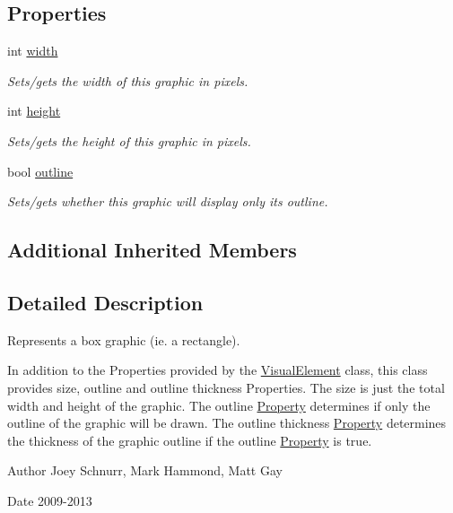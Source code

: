 \subsection*{Properties}
\begin{DoxyCompactItemize}
\item 
\hypertarget{class_picto_1_1_box_graphic_a52194af79e05c8ea7d895250cbc9ce5a}{int \hyperlink{class_picto_1_1_box_graphic_a52194af79e05c8ea7d895250cbc9ce5a}{width}}\label{class_picto_1_1_box_graphic_a52194af79e05c8ea7d895250cbc9ce5a}

\begin{DoxyCompactList}\small\item\em Sets/gets the width of this graphic in pixels. \end{DoxyCompactList}\item 
\hypertarget{class_picto_1_1_box_graphic_aa3040f2594acaa4da7b7b322bdc2c13d}{int \hyperlink{class_picto_1_1_box_graphic_aa3040f2594acaa4da7b7b322bdc2c13d}{height}}\label{class_picto_1_1_box_graphic_aa3040f2594acaa4da7b7b322bdc2c13d}

\begin{DoxyCompactList}\small\item\em Sets/gets the height of this graphic in pixels. \end{DoxyCompactList}\item 
\hypertarget{class_picto_1_1_box_graphic_a7c3cd6c20925e294df01c40c6a798518}{bool \hyperlink{class_picto_1_1_box_graphic_a7c3cd6c20925e294df01c40c6a798518}{outline}}\label{class_picto_1_1_box_graphic_a7c3cd6c20925e294df01c40c6a798518}

\begin{DoxyCompactList}\small\item\em Sets/gets whether this graphic will display only its outline. \end{DoxyCompactList}\end{DoxyCompactItemize}
\subsection*{Additional Inherited Members}


\subsection{Detailed Description}
Represents a box graphic (ie. a rectangle). 

In addition to the Properties provided by the \hyperlink{struct_picto_1_1_visual_element}{Visual\-Element} class, this class provides size, outline and outline thickness Properties. The size is just the total width and height of the graphic. The outline \hyperlink{class_picto_1_1_property}{Property} determines if only the outline of the graphic will be drawn. The outline thickness \hyperlink{class_picto_1_1_property}{Property} determines the thickness of the graphic outline if the outline \hyperlink{class_picto_1_1_property}{Property} is true. \begin{DoxyAuthor}{Author}
Joey Schnurr, Mark Hammond, Matt Gay 
\end{DoxyAuthor}
\begin{DoxyDate}{Date}
2009-\/2013 
\end{DoxyDate}



